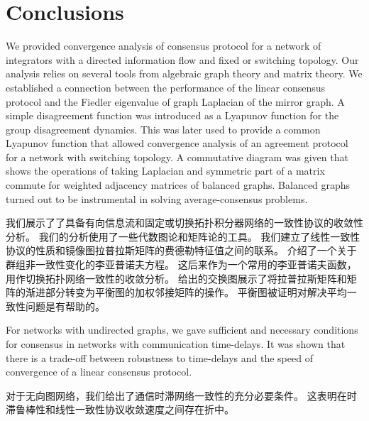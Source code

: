 \documentclass{article}
\begin{document}
\section{Conclusions}
{\color[gray]{0.5}
\noindent We provided convergence analysis of consensus protocol for a network of integrators with a directed information ﬂow and ﬁxed or switching topology. 
Our analysis relies on several tools from algebraic graph theory and matrix theory. 
We established a connection between the performance of the linear consensus protocol and the Fiedler eigenvalue of graph Laplacian of the mirror graph. 
A simple disagreement function was introduced as a Lyapunov function for the group disagreement dynamics. 
This was later used to provide a common Lyapunov function that allowed convergence analysis of an agreement protocol for a network with switching topology. 
A commutative diagram was given that shows the operations of taking Laplacian and symmetric part of a matrix commute for weighted adjacency matrices of balanced graphs. 
Balanced graphs turned out to be instrumental in solving average-consensus problems.
}

\noindent 我们展示了了具备有向信息流和固定或切换拓扑积分器网络的一致性协议的收敛性分析。
我们的分析使用了一些代数图论和矩阵论的工具。
我们建立了线性一致性协议的性质和镜像图拉普拉斯矩阵的费德勒特征值之间的联系。
介绍了一个关于群组非一致性变化的李亚普诺夫方程。
这后来作为一个常用的李亚普诺夫函数，用作切换拓扑网络一致性的收敛分析。
给出的交换图展示了将拉普拉斯矩阵和矩阵的渐进部分转变为平衡图的加权邻接矩阵的操作。
平衡图被证明对解决平均一致性问题是有帮助的。

{\color[gray]{0.5}
For networks with undirected graphs, we gave suﬃcient and necessary conditions for consensus in networks with communication time-delays. 
It was shown that there is a trade-oﬀ between robustness to time-delays and the speed of convergence of a linear consensus protocol. 
}

对于无向图网络，我们给出了通信时滞网络一致性的充分必要条件。
这表明在时滞鲁棒性和线性一致性协议收敛速度之间存在折中。
\end{document}
